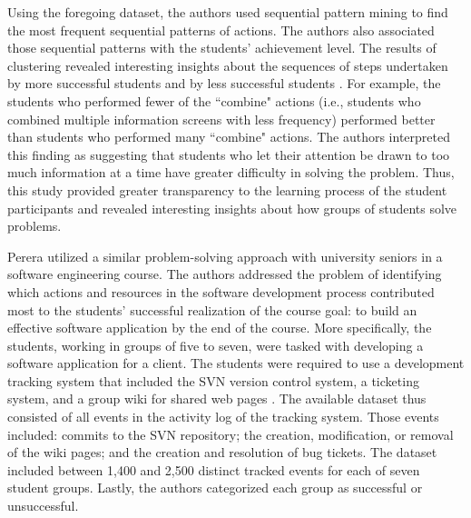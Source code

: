 Using the foregoing dataset, the authors used sequential pattern mining to find the most frequent sequential patterns of actions.  The authors also associated those sequential patterns with the students' achievement level.   The results of clustering revealed interesting insights about the sequences of steps undertaken by more successful students and by less successful students \cite[Table 1]{Martinez}.  For example, the students who performed fewer of the ``combine" actions (i.e., students who combined multiple information screens with less frequency) performed better than students who performed many ``combine" actions.  The authors interpreted this finding as suggesting that students who let their attention be drawn to too much information at a time have greater difficulty in solving the problem.  Thus, this study provided greater transparency to the learning process of the student participants and revealed interesting insights about how groups of students solve problems.  

Perera \cite{Perera} utilized a similar problem-solving approach with university seniors in a software engineering course.  The authors addressed the problem of identifying which actions and resources in the software development process contributed most to the students' successful realization of the course goal: to build an effective software application by the end of the course.  More specifically, the students, working in groups of five to seven, were tasked with developing a software application for a client.  The students were required to use a development tracking system that included the SVN version control system, a ticketing system, and a group wiki for shared web pages \cite[Section 3.2]{Perera}. The available dataset thus consisted of all events in the activity log of the tracking system.  Those events included: commits to the SVN repository; the creation, modification, or removal of the wiki pages; and the creation and resolution of bug tickets.  The dataset included between 1,400 and 2,500 distinct tracked events for each of seven student groups.  Lastly, the authors categorized each group as successful or unsuccessful.

